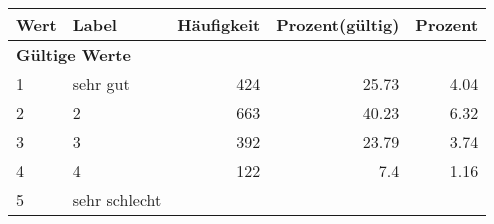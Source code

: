      \begin{longtable}{lXrrr}
     \toprule
     \textbf{Wert} & \textbf{Label} & \textbf{Häufigkeit} & \textbf{Prozent(gültig)} & \textbf{Prozent} \\
     \endhead
     \midrule
     \multicolumn{5}{l}{\textbf{Gültige Werte}}\\

     1 &
     \multicolumn{1}{X}{ sehr gut   } &


       \num{424} &
       \num[round-mode=places,round-precision=2]{25.73} &
         \num[round-mode=places,round-precision=2]{4.04} \\

     2 &
     \multicolumn{1}{X}{ 2   } &


       \num{663} &
       \num[round-mode=places,round-precision=2]{40.23} &
         \num[round-mode=places,round-precision=2]{6.32} \\

     3 &
     \multicolumn{1}{X}{ 3   } &


       \num{392} &
       \num[round-mode=places,round-precision=2]{23.79} &
         \num[round-mode=places,round-precision=2]{3.74} \\

     4 &
     \multicolumn{1}{X}{ 4   } &


       \num{122} &
       \num[round-mode=places,round-precision=2]{7.4} &
         \num[round-mode=places,round-precision=2]{1.16} \\

     5 &
     \multicolumn{1}{X}{ sehr schlecht   } &



\end{longtable}
